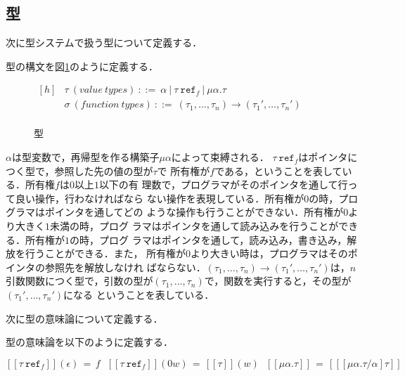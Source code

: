 \subsection{型}
次に型システムで扱う型について定義する．

\begin{definition}[型]
型の構文を図\ref{type}のように定義する．
  \begin{figure}[H]
    \centering
    \fbox
    {$
    \begin{aligned}[h]
      & \tau\ (\mathit{value\ types})\ ::=
      \ \alpha\ |\ \tau \ \texttt{ref}_f\ |\ \mu \alpha . \tau \\[-3pt]
      & \sigma\ (\mathit{function\ types})\ ::=
      \ (\tau _1, \dots, \tau _n) \rightarrow (\tau _{1}', \dots, \tau _{n}') \\
    \end{aligned}
    $}
    \caption{型}
    \label{type}
  \end{figure}
\end{definition}

$\alpha$は型変数で，再帰型を作る構築子$\mu \alpha$によって束縛される．
$\tau \ \texttt{ref}_f$はポインタにつく型で，参照した先の値の型が$\tau$で
所有権が$f$である，ということを表している．所有権$f$は$0$以上$1$以下の有
理数で，プログラマがそのポインタを通して行って良い操作，行わなければなら
ない操作を表現している．所有権が$0$の時，プログラマはポインタを通してどの
ような操作も行うことができない．所有権が$0$より大きく$1$未満の時，プログ
ラマはポインタを通して読み込みを行うことができる．所有権が$1$の時，プログ
ラマはポインタを通して，読み込み，書き込み，解放を行うことができる．また，
所有権が$0$より大きい時は，プログラマはそのポインタの参照先を解放しなけれ
ばならない．$(\tau _1, \dots, \tau _n) \rightarrow (\tau _{1}', \dots,
\tau _{n}')$は，$n$引数関数につく型で，引数の型が$(\tau _1, \dots, \tau
_n)$で，関数を実行すると，その型が$(\tau _{1}', \dots, \tau _{n}')$になる
ということを表している．

次に型の意味論について定義する．

\begin{definition}[意味論]
型の意味論を以下のように定義する．\\[-15pt]
\begin{center}
$
  [\![\tau\ \texttt{ref}_{f}]\!](\epsilon)\,=\,f ~~~
  [\![\tau\ \texttt{ref}_{f}]\!](0w)\,=\,[\![\tau]\!](w) ~~~
  [\![\mu\alpha.\tau]\!]\,=\,[\![[\mu\alpha.\tau/\alpha]\tau]\!]
$
\end{center}
\label{type_semantics}
\end{definition}

